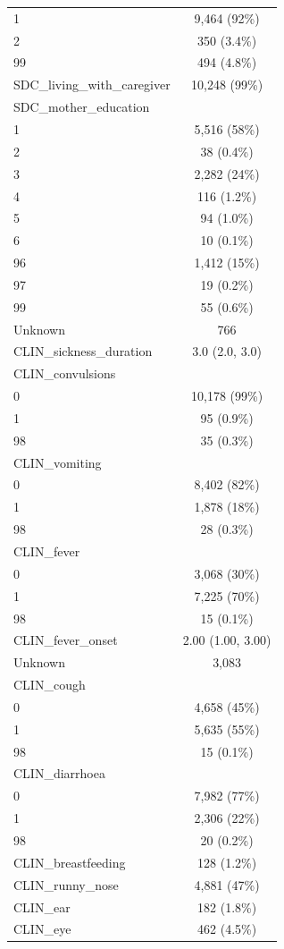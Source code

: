 \documentclass[
  letterpaper,
  DIV=11,
  numbers=noendperiod]{scrreprt}
\begin{document}
\begin{longtable}[]{@{}lc@{}}
1 & 9,464 (92\%) \\
2 & 350 (3.4\%) \\
99 & 494 (4.8\%) \\
SDC\_living\_with\_caregiver & 10,248 (99\%) \\
SDC\_mother\_education & \\
1 & 5,516 (58\%) \\
2 & 38 (0.4\%) \\
3 & 2,282 (24\%) \\
4 & 116 (1.2\%) \\
5 & 94 (1.0\%) \\
6 & 10 (0.1\%) \\
96 & 1,412 (15\%) \\
97 & 19 (0.2\%) \\
99 & 55 (0.6\%) \\
Unknown & 766 \\
CLIN\_sickness\_duration & 3.0 (2.0, 3.0) \\
CLIN\_convulsions & \\
0 & 10,178 (99\%) \\
1 & 95 (0.9\%) \\
98 & 35 (0.3\%) \\
CLIN\_vomiting & \\
0 & 8,402 (82\%) \\
1 & 1,878 (18\%) \\
98 & 28 (0.3\%) \\
CLIN\_fever & \\
0 & 3,068 (30\%) \\
1 & 7,225 (70\%) \\
98 & 15 (0.1\%) \\
CLIN\_fever\_onset & 2.00 (1.00, 3.00) \\
Unknown & 3,083 \\
CLIN\_cough & \\
0 & 4,658 (45\%) \\
1 & 5,635 (55\%) \\
98 & 15 (0.1\%) \\
CLIN\_diarrhoea & \\
0 & 7,982 (77\%) \\
1 & 2,306 (22\%) \\
98 & 20 (0.2\%) \\
CLIN\_breastfeeding & 128 (1.2\%) \\
CLIN\_runny\_nose & 4,881 (47\%) \\
CLIN\_ear & 182 (1.8\%) \\
CLIN\_eye & 462 (4.5\%) \\

\end{longtable}
\end{document}
